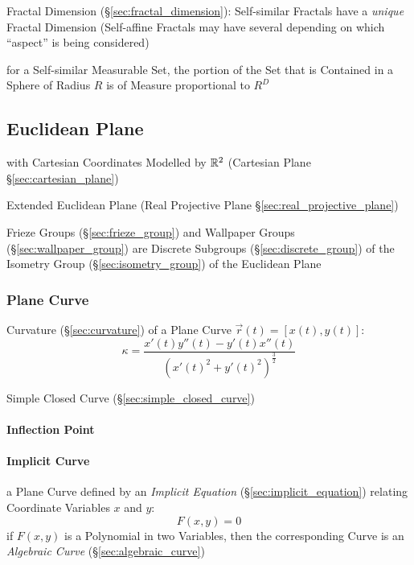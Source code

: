 \fist Fractal Dimension (\S\ref{sec:fractal_dimension}): Self-similar Fractals
have a \emph{unique} Fractal Dimension (Self-affine Fractals may have several
depending on which ``aspect'' is being considered)

for a Self-similar Measurable Set, the portion of the Set that is Contained in a
Sphere of Radius $R$ is of Measure proportional to $R^D$




\subsection{Euclidean Plane}\label{sec:euclidean_plane}

with Cartesian Coordinates Modelled by $\mathbb{R}^2$ (Cartesian Plane
\S\ref{sec:cartesian_plane})

\fist Extended Euclidean Plane (Real Projective Plane
\S\ref{sec:real_projective_plane})

Frieze Groups (\S\ref{sec:frieze_group}) and Wallpaper Groups
(\S\ref{sec:wallpaper_group}) are Discrete Subgroups
(\S\ref{sec:discrete_group}) of the Isometry Group (\S\ref{sec:isometry_group})
of the Euclidean Plane



\subsubsection{Plane Curve}\label{sec:plane_curve}

Curvature (\S\ref{sec:curvature}) of a Plane Curve $\vec{r}(t) = [x(t),y(t)]$:
\[
  \kappa = \frac{x'(t)y''(t) - y'(t)x''(t)} {(x'(t)^2 + y'(t)^2)^{\frac{3}{2}}}
\]

\fist Simple Closed Curve (\S\ref{sec:simple_closed_curve})



\paragraph{Inflection Point}\label{sec:inflection_point}\hfill

\paragraph{Implicit Curve}\label{sec:implicit_curve}\hfill

a Plane Curve defined by an \emph{Implicit Equation}
(\S\ref{sec:implicit_equation}) relating Coordinate Variables $x$ and $y$:
\[
  F(x,y) = 0
\]
if $F(x,y)$ is a Polynomial in two Variables, then the corresponding Curve is an
\emph{Algebraic Curve} (\S\ref{sec:algebraic_curve})

